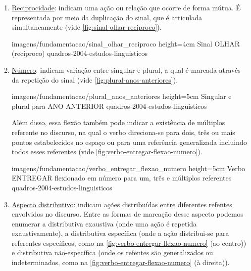 \begin{enumerate}
\begin{enumerate}
            {imagens/fundamentacao/verbo_entregar_deixis} %
            {height=5cm} %
            {Verbo ENTREGAR flexionado entre diferentes pessoas previamente estabelecidas no espaço} %
            {quadros-2004-estudos-linguisticos} %

        
        \item \underline{Reciprocidade}: indicam uma ação ou relação que ocorre de forma mútua. É representada por meio da duplicação do sinal, que é articulada simultaneamente (vide \autoref{fig:sinal-olhar-reciproco}).
        
            {imagens/fundamentacao/sinal_olhar_reciproco} %
            {height=4cm} %
            {Sinal OLHAR (recíproco)} %
            {quadros-2004-estudos-linguisticos} %
        
        
        \item \underline{Número}: indicam variação entre singular e plural, a qual é marcada através da repetição do sinal (vide \autoref{fig:plural-anos-anteriores}). 
        
            {imagens/fundamentacao/plural_anos_anteriores} %
            {height=5cm} %
            {Singular e plural para ANO ANTERIOR} %
            {quadros-2004-estudos-linguisticos} %
            
        Além disso, essa flexão também pode indicar a existência de múltiplos referente no discurso, na qual o verbo direciona-se para dois, três ou mais pontos estabelecidos no espaço ou para uma referência generalizada incluindo todos esses referentes (vide \autoref{fig:verbo-entregar-flexao-numero}).

            {imagens/fundamentacao/verbo_entregar_flexao_numero} %
            {height=5cm} %
            {Verbo ENTREGAR flexionado em número para um, três e múltiplos referentes} %
            {quadros-2004-estudos-linguisticos} %

        \item \underline{Aspecto distributivo}: indicam ações distribuídas entre diferentes refentes envolvidos no discurso. %
        Entre as formas de marcação desse aspecto podemos enumerar a distributiva exaustiva (onde uma ação é repetida exaustivamente), a distributiva específica (onde a ação distribui-se para referentes específicos, como na \autoref{fig:verbo-entregar-flexao-numero} (ao centro)) e distributiva não-específica (onde os refentes são generalizados ou indeterminados, como na \autoref{fig:verbo-entregar-flexao-numero} (à direita)).
        

\end{enumerate}
\end{enumerate}
